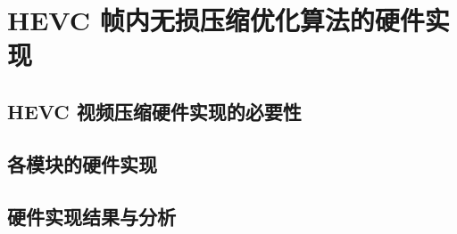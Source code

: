 \chapter{HEVC 帧内无损压缩优化算法的硬件实现}
\label{cha:c4}

\section{HEVC 视频压缩硬件实现的必要性}

\section{各模块的硬件实现}

\section{硬件实现结果与分析}